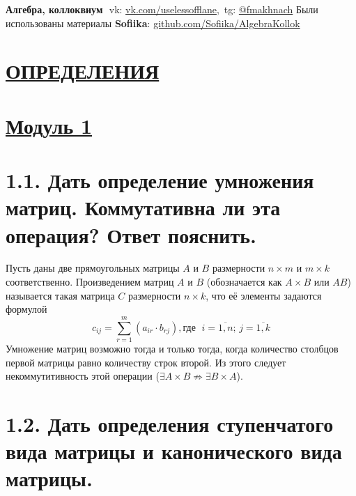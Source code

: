 \documentclass{article}
\begin{document}
\textbf{\huge Алгебра, коллоквиум}
\Large
\newline $ $
\newline vk: \href{https://vk.com/uselessofflane}{\color{blue}vk.com/uselessofflane},\, tg: \href{https://t.me/fmakhnach}{\color{blue}@fmakhnach}
\newline Были использованы материалы \textbf{Sofiika}: \href{https://github.com/Sofiika/AlgebraKollok}{\color{blue} github.com/Sofiika/AlgebraKollok }

\tableofcontents

\newpage
{}
\section*{\LARGE\centering \underline{ОПРЕДЕЛЕНИЯ}}

\section*{\LARGE\centering \underline{Модуль 1}}

\section*{\LARGE \textbf{1.1. Дать определение умножения матриц. Коммутативна ли эта операция? Ответ пояснить.}}

Пусть даны две прямоугольных матрицы $A$ и $B$ размерности $n \times m$ и $m \times k$ соответственно. Произведением матриц $A$ и $B$ (обозначается как $A \times B$ или $AB$) называется такая матрица $C$ размерности $n \times k$, что её элементы задаются формулой 
$$
c_{ij} = \sum_{r = 1}^{m}(a_{ir}\cdot b_{rj}), \mbox{где }\; i = \overline{1, n};\, j = \overline{1, k}
$$
Умножение матриц возможно тогда и только тогда, когда количество столбцов первой матрицы равно количеству строк второй. Из этого следует некоммутитивность этой операции ($\exists A \times B \not\Rightarrow \exists B \times A$).

\section*{\LARGE 1.2. Дать определения ступенчатого вида матрицы и канонического вида матрицы. }
\end{document}
